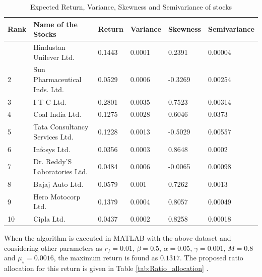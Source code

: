 \documentclass{elsarticle}
\begin{document}
\begin{table}[h]
	\small
\caption{Expected Return, Variance, Skewness and Semivariance of stocks}
\begin{center}
\label{tab:ER_V_Sk_S}
\begin{tabular}{ | >{\centering\arraybackslash}m{0.75cm} | >{\centering\arraybackslash}m{3cm} | 
>{\centering\arraybackslash}m{1.5cm}|>{\centering\arraybackslash}m{1.5cm}|>{\centering\arraybackslash}m{1.5cm}|>{\centering\arraybackslash}m{2cm}|}
\hline
Rank &  Name of the Stocks &  Return &  Variance &  Skewness &  Semivariance\\
\hline
{1}& {Hindustan Unilever Ltd.} & {0.1443} & {0.0001} & {0.2391}  & {0.00004}\\
\hline
{2} & {Sun Pharmaceutical Inds. Ltd.}& {0.0529} & {0.0006} & {-0.3269} & {0.00254}\\
\hline
{3} & {I T C Ltd.} & {0.2801} & {0.0035} & {0.7523} & {0.00314}\\
\hline
{4} & {Coal India Ltd.} & {0.1275} & {0.0028} & {0.6046} & {0.0373}\\	
\hline
{5} & {Tata Consultancy Services Ltd.} & {0.1228} & {0.0013} & {-0.5029} & {0.00557}\\		
\hline
{6} & {Infosys Ltd.} & {0.0356} & {0.0003} & {0.8648} & {0.0002}\\		
\hline
{7} & {Dr. Reddy'S Laboratories Ltd.} & {0.0484} & {0.0006} & {-0.0065} & {0.00098}\\		
\hline
{8} & {Bajaj Auto Ltd.} & {0.0579} & {0.001} & {0.7262} & {0.0013}\\		
\hline
{9} & {Hero Motocorp Ltd.} & {0.1379} & {0.0004} & {0.8057} & {0.00049}\\		
\hline
{10} & {Cipla Ltd.} & {0.0437} & {0.0002} & {0.8258} & {0.00018}\\		
\hline
\end{tabular}
\end{center}
\end{table}

When the algorithm is executed in MATLAB with the above dataset and considering other parameters as $r_f=0.01$, $ \beta 
=0.5 $, $\alpha =0.05$, $ \gamma =0.001$, $ M=0.8 $ and $ \mu_s=0.0016 $, the maximum return is found as $0.1317$. The 
proposed ratio allocation for this return is given in Table \ref{tab:Ratio_allocation} .
\end{document}
